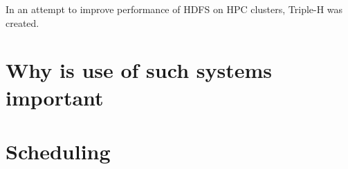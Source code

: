 \documentclass{report}
\begin{document}
	
	
	

	

	
	
	
    In an attempt to improve performance of HDFS on HPC clusters, Triple-H was
created.  \section{Why is use of such systems important} \section{Scheduling}
\end{document}
